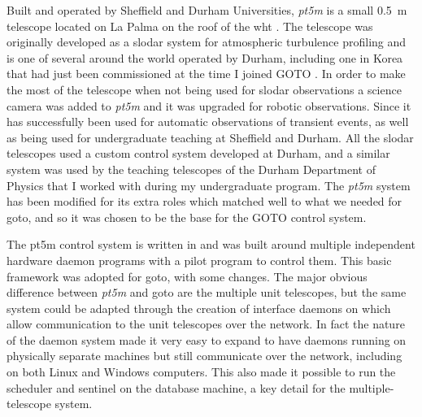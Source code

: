 \begin{colsection}
\begin{colsection}
Built and operated by Sheffield and Durham Universities, \textit{pt5m} is a small \SI{0.5}{\metre} telescope located on La Palma on the roof of the \gls{wht} \citep{pt5m}. The telescope was originally developed as a \gls{slodar} system for atmospheric turbulence profiling \citep{SLODAR_LaPalma} and is one of several around the world operated by Durham, including one in Korea that had just been commissioned at the time I joined GOTO \citep{SLODAR_Korea}. In order to make the most of the telescope when not being used for \gls{slodar} observations a science camera was added to \textit{pt5m} and it was upgraded for robotic observations. Since it has successfully been used for automatic observations of transient events, as well as being used for undergraduate teaching at Sheffield and Durham. All the \gls{slodar} telescopes used a custom control system developed at Durham, and a similar system was used by the teaching telescopes of the Durham Department of Physics that I worked with during my undergraduate program. The \textit{pt5m} system has been modified for its extra roles which matched well to what we needed for \gls{goto}, and so it was chosen to be the base for the GOTO control system.

The pt5m control system is written in  and was built around multiple independent hardware daemon programs with a pilot program to control them. This basic framework was adopted for \gls{goto}, with some changes. The major obvious difference between \textit{pt5m} and \gls{goto} are the multiple unit telescopes, but the same system could be adapted through the creation of interface daemons on which allow communication to the unit telescopes over the network. In fact the nature of the daemon system made it very easy to expand to have daemons running on physically separate machines but still communicate over the network, including on both Linux and Windows computers. This also made it possible to run the scheduler and sentinel on the database machine, a key detail for the multiple-telescope system.


\end{colsection}
\end{colsection}
